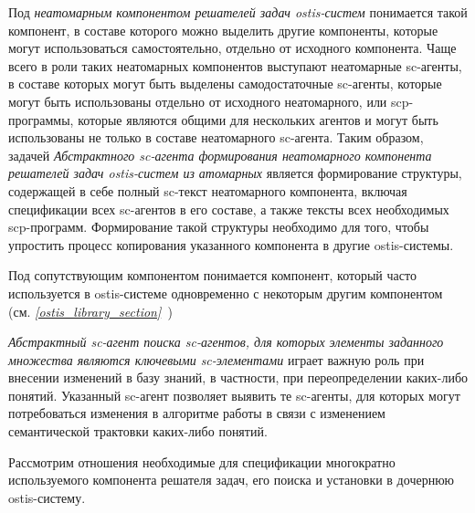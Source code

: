 Под \textit{неатомарным компонентом решателей задач ostis-систем} понимается такой компонент, в составе которого можно выделить другие компоненты, которые могут использоваться самостоятельно, отдельно от исходного компонента. Чаще всего в роли таких неатомарных компонентов выступают неатомарные sc-агенты, в составе которых могут быть выделены самодостаточные sc-агенты, которые могут быть использованы отдельно от исходного неатомарного, или scp-программы, которые являются общими для нескольких агентов и могут быть использованы не только в составе неатомарного sc-агента. Таким образом, задачей \textit{Абстрактного sc-агента формирования неатомарного компонента решателей задач ostis-систем из атомарных} является формирование структуры, содержащей в себе полный sc-текст неатомарного компонента, включая спецификации всех \mbox{sc-агентов} в его составе, а также тексты всех необходимых scp-программ. Формирование такой структуры необходимо для того, чтобы упростить процесс копирования указанного компонента в другие ostis-системы.

Под сопутствующим компонентом понимается компонент, который часто используется в ostis-системе одновременно с некоторым другим компонентом (см. \textit{\ref{ostis_library_section}~})

\textit{Абстрактный sc-агент поиска sc-агентов, для которых элементы заданного множества являются ключевыми sc-элементами} играет важную роль при внесении изменений в базу знаний, в частности, при переопределении каких-либо понятий. Указанный sc-агент позволяет выявить те sc-агенты, для которых могут потребоваться изменения в алгоритме работы в связи с изменением семантической трактовки каких-либо понятий.

Рассмотрим отношения необходимые для спецификации многократно используемого компонента решателя задач, его поиска и установки в дочернюю ostis-систему.

